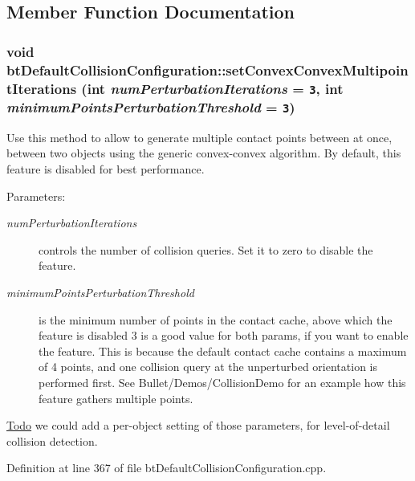 \subsection{Member Function Documentation}
\hypertarget{classbt_default_collision_configuration_39a173eedf0e8d55dd89ef3b637925a9}{
\subsubsection[setConvexConvexMultipointIterations]{\setlength{\rightskip}{0pt plus 5cm}void btDefaultCollisionConfiguration::setConvexConvexMultipointIterations (int {\em numPerturbationIterations} = {\tt 3}, \/  int {\em minimumPointsPerturbationThreshold} = {\tt 3})}}
\label{classbt_default_collision_configuration_39a173eedf0e8d55dd89ef3b637925a9}


Use this method to allow to generate multiple contact points between at once, between two objects using the generic convex-convex algorithm. By default, this feature is disabled for best performance. \begin{Desc}
\item[Parameters:]
\begin{description}
\item[{\em numPerturbationIterations}]controls the number of collision queries. Set it to zero to disable the feature. \item[{\em minimumPointsPerturbationThreshold}]is the minimum number of points in the contact cache, above which the feature is disabled 3 is a good value for both params, if you want to enable the feature. This is because the default contact cache contains a maximum of 4 points, and one collision query at the unperturbed orientation is performed first. See Bullet/Demos/CollisionDemo for an example how this feature gathers multiple points. \end{description}
\end{Desc}
\begin{Desc}
\item[\hyperlink{todo__todo000013}{Todo}]we could add a per-object setting of those parameters, for level-of-detail collision detection. \end{Desc}


Definition at line 367 of file btDefaultCollisionConfiguration.cpp.

